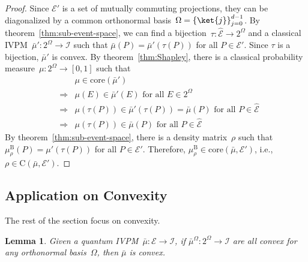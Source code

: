 \documentclass[12pt]{iopart}
\theoremstyle{plain}
\newtheorem{lemma}[thm]{Lemma}
\theoremstyle{definition}
\theoremstyle{remark}
\newcommand{\events}{\ensuremath{\mathcal{E}}}
\newcommand{\pmeas}{\ensuremath{\mu}}
\newcommand{\coreBorn}{\ensuremath{\mathrm{C}}}
\begin{document}
\begin{proof}Since $\events'$ is a set of mutually commuting projections,
they can be diagonalized by a common orthonormal basis~$\Omega=\left\{ \ket{j}\right\} _{j=0}^{d-1}$.
By theorem~\ref{thm:sub-event-space}, we can find a bijection~$\tau:\widehat{\events}\rightarrow2^{\Omega}$
and a classical IVPM~$\bar{\mu}':2^{\Omega}\rightarrow\mathscr{I}$
such that $\bar{\mu}\left(P\right)=\bar{\mu}'\left(\tau\left(P\right)\right)$
for all $P\in\events'$. Since $\tau$ is a bijection, $\bar{\mu}'$
is convex. By theorem~\ref{thm:Shapley}, there is a classical probability
measure~$\pmeas:2^{\Omega}\rightarrow\left[0,1\right]$ such that
\begin{eqnarray*}
 &  & \pmeas\in\mathrm{core}\left(\bar{\mu}'\right)\\
 & \Rightarrow & \pmeas\left(E\right)\in\bar{\mu}'\left(E\right)\textrm{ for all }E\in2^{\Omega}\\
 & \Rightarrow & \pmeas\left(\tau\left(P\right)\right)\in\bar{\mu}'\left(\tau\left(P\right)\right)=\bar{\mu}\left(P\right)\textrm{ for all }P\in\widehat{\events}\\
 & \Rightarrow & \pmeas\left(\tau\left(P\right)\right)\in\bar{\mu}\left(P\right)\textrm{ for all }P\in\widehat{\events}
\end{eqnarray*}
By theorem~\ref{thm:sub-event-space},
there is a density matrix~$\rho$ such that $\mu_{\rho}^{\mathrm{B}}\left(P\right)=\mu'\left(\tau\left(P\right)\right)$
for all $P\in\events'$. Therefore, $\mu_{\rho}^{\mathrm{B}}\in\mathrm{core}\left(\bar{\mu},\events'\right)$,
i.e., $\rho\in\coreBorn\left(\bar{\mu},\events'\right)$.\end{proof}

\subsection{Application on Convexity}

The rest of the section focus on convexity.

\begin{lemma}Given a quantum IVPM~$\bar{\mu}:\events\rightarrow\mathscr{I}$,
if $\bar{\mu}^{\Omega}:2^{\Omega}\rightarrow\mathscr{I}$ are all
convex for any orthonormal basis~$\Omega$, then $\bar{\mu}$ is
convex.\end{lemma}
\end{document}
